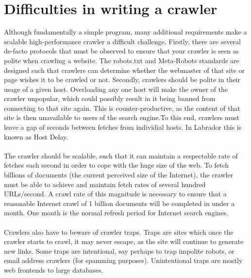\section{Difficulties in writing a crawler}
Although fundamentally a simple program, many additional requirements make a scalable high-performance crawler a difficult challenge. Firstly, there are several de-facto protocols that must be observed to ensure that your crawler is seen as polite when crawling a website. The robots.txt and Meta-Robots standards are designed such that crawlers can determine whether the webmaster of that site or page wishes it to be crawled or not. Secondly, crawlers should be polite in their usage of a given host. Overloading any one host will make the owner of the crawler unpopular, which could possibly result in it being banned from connecting to that site again. This is counter-productive, as the content of that site is then unavailable to users of the search engine.To this end, crawlers must leave a gap of seconds between fetches from individial hosts. In Labrador this is known as Host Delay.\\
\ \\
The crawler should be scalable, such that it can maintain a respectable rate of fetches each second in order to cope with the huge size of the web. To fetch billions of documents (the current perceived size of the Internet), the crawler must be able to achieve and maintain fetch rates of several hundred URLs/second. A crawl rate of this magnitude is necessary to ensure that a reasonable Internet crawl of 1 billion documents will be completed in under a month. One month is the normal refresh period for Internet search engines.\\
\ \\
Crawlers also have to beware of crawler traps. Traps are sites which once the crawler starts to crawl, it may never escape, as the site will continue to generate new links. Some traps are intentional, say perhaps to trap impolite robots, or email address crawlers (for spamming purposes). Unintentional traps are mostly web frontends to large databases.
\ \\

